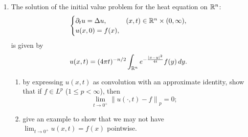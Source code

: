 \documentclass[11pt]{article}
\newcommand{\norm}[1]{\left\lVert #1 \right\rVert}
\begin{document}
\begin{enumerate}[leftmargin=*, label=\arabic*.]
        ($\leftarrow$) Suppose $f \in C_{0}(\R^{n})$.
        We show that there exists a sequence $f_n$ in $C_{c}(\R^{n})$ such that $f_n \to f$.
        Let 
        \[
        f_n(x) = \begin{cases}
            f(x) & \text{ if } \|x\|_{2} < n\\
            f(x \frac{n}{\|x\|_2}) \cdot  (n + 1 - \|x\|_{2}) & \text{ if } n \leq \|x\|_{2} < n + 1\\
            0  & \text{ otherwise}
        \end{cases}
        .\] 
        In particular, $\text{supp}(f_n) \subset  \|x\|_{2} \leq n+1$, so $f_n \in C_c$.
        $f_n$ is continous inside $\|x\|_{2} < n$ because $f$ is  continuous. It is continuous at the boundary $\|x\|_{2} = n$ because then $x n / \|x\|_2 = x$ so $f(x) = f(x n / \|x\|_2) = f(x\cdot  1)$.
        It is continuous in the annulus $n < \|x\|_{2} < n + 1$ because it is the composition and product of functions ($\|x\|_{2}$ is continuous and doesn't take $0$ in this annulus).
        Finally, it is continuous at the boundary $\|x\|_{2} = n+1$ because 
        \[
        f(x \frac{n}{\|x\|_{2}}) (n + 1 - \|x\|_2) = f(x \frac{n}{ \|x\|_{2}}) (n + 1 - n + 1) = 0
        .\] 

        Next, $|f_n(x) - f(x)| = 0$ when $\|x\|_{2} \leq 0$, and $|f_n(x) - f(x)| \leq |f(x n / \|x\|_2)(1) - f(x)| \leq \sup_{\|x\|_2 \geq n} |f(x)|$, and $\leq \sup_{\|x\|_{2} \geq n+1} |f(x)|$ for $\|x\|_{2} \geq n + 1$.
        Therefore, in every case we can see that we always have $|f_n(x) - f| \leq 2\sup_{\|x\|_{2} \geq n} |f(x)|$, which goes to zero as $n \to \infty$ since $f \in C_0(\R^{n})$.
        Therefore, $f_n \to f$, as desired.

        Thus, $\overline{C_c(\R^{n})} = C_0(\R^{n})$.

    \item The solution of the initial value problem for the heat equation on $\mathbb{R}^n$:
    \[
    \begin{cases}
        \partial_t u = \Delta u, & (x,t) \in \mathbb{R}^n \times (0,\infty), \\
        u(x,0) = f(x),
    \end{cases}
    \]
    is given by
    \[
    u(x,t) = (4\pi t)^{-n/2} \int_{\mathbb{R}^n} e^{-\frac{|x-y|^2}{4t}} f(y)\,dy.
    \]
    \begin{enumerate}[label=(\alph*)]
        \item by expressing $u(x,t)$ as convolution with an approximate identity,
        show that if $f \in L^p$ ($1 \le p < \infty$), then
        \[
        \lim_{t \to 0^+} \norm{u(\cdot,t)-f}_p = 0;
        \]
        \item give an example to show that we may not have $\lim_{t \to 0^+} u(x,t) = f(x)$ pointwise.
    \end{enumerate}



\end{enumerate}
\end{document}
